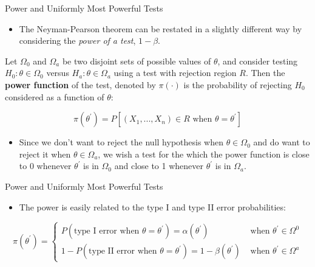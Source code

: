 \documentclass[
  ignorenonframetext,
]{beamer}
\providecommand{\tightlist}{%
  \setlength{\itemsep}{0pt}\setlength{\parskip}{0pt}}\usepackage{longtable,booktabs,array}
\begin{document}
\begin{frame}{Power and Uniformly Most Powerful Tests}
\protect\hypertarget{power-and-uniformly-most-powerful-tests}{}
\begin{itemize}[<+->]
\tightlist
\item
  The Neyman-Pearson theorem can be restated in a slightly different way
  by considering the \emph{power of a test}, \(1 - \beta\).
\end{itemize}

\begin{tcolorbox}[enhanced jigsaw, left=2mm, breakable, bottomrule=.15mm, colframe=quarto-callout-important-color-frame, arc=.35mm, leftrule=.75mm, colbacktitle=quarto-callout-important-color!10!white, titlerule=0mm, opacityback=0, coltitle=black, opacitybacktitle=0.6, colback=white, toprule=.15mm, toptitle=1mm, bottomtitle=1mm, title=\textcolor{quarto-callout-important-color}{\faExclamation}\hspace{0.5em}{Definition}, rightrule=.15mm]

Let \(\Omega_{0}\) and \(\Omega_{a}\) be two disjoint sets of possible
values of \(\theta\), and consider testing
\(H_{0}: \theta \in \Omega_{0}\) versus \(H_{a}: \theta \in \Omega_{a}\)
using a test with rejection region \(R\). Then the \textbf{power
function} of the test, denoted by \(\pi(\cdot)\) is the probability of
rejecting \(H_{0}\) considered as a function of \(\theta\):

\[ 
\pi(\theta^{\prime}) = P[(X_{1},...,X_{n}) \in R \text{ when } \theta = \theta^{\prime}]
\]

\end{tcolorbox}

\begin{itemize}[<+->]
\tightlist
\item
  Since we don't want to reject the null hypothesis when
  \(\theta \in \Omega_{0}\) and do want to reject it when
  \(\theta \in \Omega_{a}\), we wish a test for the which the power
  function is close to 0 whenever \(\theta^{\prime}\) is in
  \(\Omega_{0}\) and close to 1 whenever \(\theta^{\prime}\) is in
  \(\Omega_{a}\).
\end{itemize}
\end{frame}

\begin{frame}{Power and Uniformly Most Powerful Tests}
\protect\hypertarget{power-and-uniformly-most-powerful-tests-1}{}
\begin{itemize}[<+->]
\tightlist
\item
  The power is easily related to the type I and type II error
  probabilities:
\end{itemize}

\[
\pi(\theta^{\prime}) = \begin{cases}
P(\text{type I error when }\theta = \theta^{\prime}) = \alpha(\theta^{\prime}) & \text{ when } \theta^{\prime} \in \Omega^{0} \\
1 - P(\text{type II error when }\theta = \theta^{\prime}) = 1 - \beta(\theta^{\prime}) & \text{ when } \theta^{\prime} \in \Omega^{a}
\end{cases}
\]
\end{frame}
\end{document}
